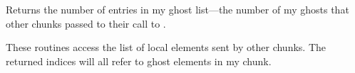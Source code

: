 \documentclass[10pt]{article}
\begin{document}
Returns the number of entries in my ghost list---the number of my ghosts that
other chunks passed to their call to .


These routines access the list of local elements sent by other chunks.  
The returned indices will all refer to ghost elements in my chunk.



%   



\end{document}
